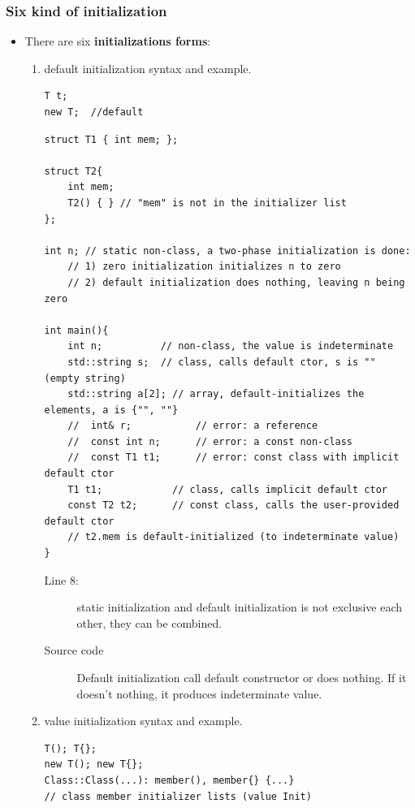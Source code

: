 \documentclass[a4paper,11pt,twoside]{book}
\begin{document}
\subsubsection{Six kind of initialization}
\begin{itemize}
	\item There are six \textbf{initializations forms}:
	\begin{enumerate}
		\item default initialization syntax and example.
\begin{lstlisting}[numbers=none]
T t;
new T;  //default
\end{lstlisting}

	
\begin{lstlisting}
struct T1 { int mem; };

struct T2{
	int mem;
	T2() { } // "mem" is not in the initializer list
};

int n; // static non-class, a two-phase initialization is done:
	// 1) zero initialization initializes n to zero
	// 2) default initialization does nothing, leaving n being zero

int main(){
	int n;          // non-class, the value is indeterminate
	std::string s;  // class, calls default ctor, s is "" (empty string)
	std::string a[2]; // array, default-initializes the elements, a is {"", ""}
	//  int& r;           // error: a reference
	//  const int n;      // error: a const non-class
	//  const T1 t1;      // error: const class with implicit default ctor
	T1 t1;            // class, calls implicit default ctor
	const T2 t2;      // const class, calls the user-provided default ctor
	// t2.mem is default-initialized (to indeterminate value)
}
\end{lstlisting}

\begin{description}
	\item[Line 8:] static initialization and default initialization is not exclusive each other, they can be combined. 
	\item[Source code] Default initialization call default constructor or does nothing. If it doesn't nothing, it produces indeterminate value.
\end{description}


		\item value initialization syntax and example.
\begin{lstlisting}[numbers=none]
T(); T{};
new T(); new T{};
Class::Class(...): member(), member{} {...} 
// class member initializer lists (value Init)
\end{lstlisting}



\end{enumerate}
\end{itemize}
\end{document}
